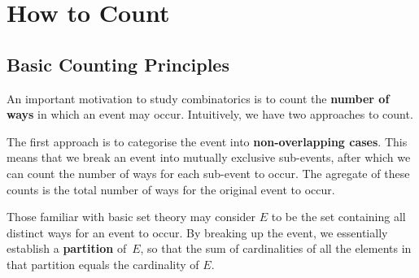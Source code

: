 \documentclass[math]{amznotes}
\theoremstyle{remark}
\begin{document}
\tableofcontents

\chapter{How to Count}
\section{Basic Counting Principles}
An important motivation to study combinatorics is to count the \textbf{number of ways} in which an event may occur. Intuitively, we have two approaches to count.

The first approach is to categorise the event into \textbf{non-overlapping cases}. This means that we break an event into mutually exclusive sub-events, after which we can count the number of ways for each sub-event to occur. The agregate of these counts is the total number of ways for the original event to occur.

Those familiar with basic set theory may consider $E$ to be the set containing all distinct ways for an event to occur. By breaking up the event, we essentially establish a \textbf{partition} of~$E$, so that the sum of cardinalities of all the elements in that partition equals the cardinality of $E$.
\end{document}

